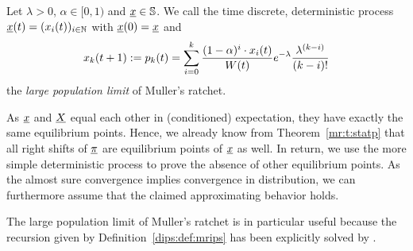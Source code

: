 \begin{Definition} \label{dips:def:mrips}
Let $\lambda > 0$, $\alpha \in [0,1)$ and $\underline{x} \in \mathbb{S}$.  
We call the time discrete, deterministic process $\underline{x} \! \left( t \right) = (x_{i} \! \left( t \right))_{i \in
\mathbb{N}}$ with $\underline{x} \! \left( 0 \right) = \underline{x}$ and 
\begin{align*}
x_{k} \! \left( t+1 \right) := p_k(t) = 
	\sum_{i=0}^k \frac{(1-\alpha)^{i} \cdot x_{i} \! \left( t \right)}{W(t)}
				 e^{-\lambda} \frac{\lambda^{(k-i)}}{(k-i)!}
\end{align*}
the \emph{large population limit} of Muller's ratchet.
\end{Definition}

\noindent
As $\underline{x}$ and $\underline{X}$ equal each other in (conditioned) expectation, they have exactly the same
equilibrium points. Hence, we already know from Theorem~\ref{mr:t:statp} that all right shifts of
$\underline{\pi}$ are equilibrium points of $\underline{x}$ as well. In return, we use the more simple
deterministic process to prove the absence of other equilibrium points. As the
almost sure convergence implies convergence in distribution, we can furthermore
assume that the claimed approximating behavior holds.

The large population limit of Muller's ratchet is in particular useful because the recursion given
by Definition~\ref{dips:def:mrips} has been explicitly solved by \citet{maia_analytical_2003}.

